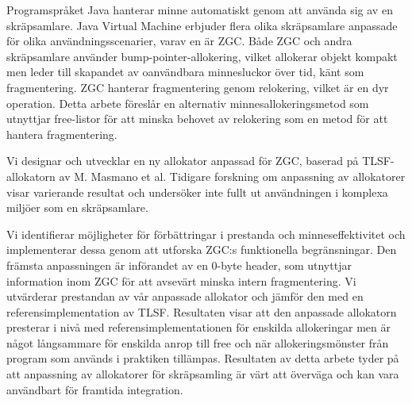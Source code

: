 
Programspråket Java hanterar minne automatiskt genom att använda sig av en skräpsamlare. Java Virtual Machine erbjuder flera olika skräpsamlare anpassade för olika användningsscenarier, varav en är ZGC. Både ZGC och andra skräpsamlare använder bump-pointer-allokering, vilket allokerar objekt kompakt men leder till skapandet av oanvändbara minnesluckor över tid, känt som fragmentering. ZGC hanterar fragmentering genom relokering, vilket är en dyr operation. Detta arbete föreslår en alternativ minnesallokeringsmetod som utnyttjar free-listor för att minska behovet av relokering som en metod för att hantera fragmentering.

Vi designar och utvecklar en ny allokator anpassad för ZGC, baserad på TLSF-allokatorn av M. Masmano et al. Tidigare forskning om anpassning av allokatorer visar varierande resultat och undersöker inte fullt ut användningen i komplexa miljöer som en skräpsamlare.

Vi identifierar möjligheter för förbättringar i prestanda och minneseffektivitet och implementerar dessa genom att utforska ZGC:s funktionella begränsningar. Den främsta anpassningen är införandet av en 0-byte header, som utnyttjar information inom ZGC för att avsevärt minska intern fragmentering. Vi utvärderar prestandan av vår anpassade allokator och jämför den med en referensimplementation av TLSF. Resultaten visar att den anpassade allokatorn presterar i nivå med referensimplementationen för enskilda allokeringar men är något långsammare för enskilda anrop till free och när allokeringsmönster från program som används i praktiken tillämpas. Resultaten av detta arbete tyder på att anpassning av allokatorer för skräpsamling är värt att överväga och kan vara användbart för framtida integration.

